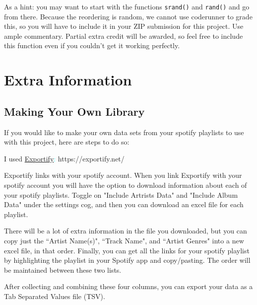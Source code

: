 As a hint: you may want to start with the functions \texttt{srand()} and \texttt{rand()} and go from there. Because the reordering is random, we cannot use coderunner to grade this, so you will have to include it in your ZIP submission for this project. Use ample commentary. Partial extra credit will be awarded, so feel free to include this function even if you couldn't get it working perfectly. 



\section{Extra Information}

\subsection{Making Your Own Library}
If you would like to make your own data sets from your spotify playlists to use with this project, here are steps to do so:

I used \textcolor{cyan}{\href{https://exportify.net/}{Exportify}:} https://exportify.net/

Exportify links with your spotify account. When you link Exportify with your spotify account you will have the option to download information about each of your spotify playlists. Toggle on "Include Artrists Data" and "Include Album Data" under the settings cog, and then you can download an excel file for each playlist.

There will be a lot of extra information in the file you downloaded, but you can copy just the ``Artist Name(s)", ``Track Name", and ``Artist Genres" into a new excel file, in that order. Finally, you can get all the links for your spotify playlist by highlighting the playlist in your Spotify app and copy/pasting. The order will be maintained between these two lists. 

After collecting and combining these four columns, you can export your data as a Tab Separated Values file (TSV). 

